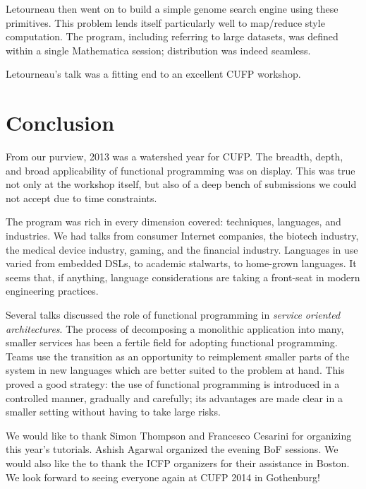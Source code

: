 \documentclass{jfp1}
\begin{document}
Letourneau then went on to build a simple genome search engine using
these primitives.  This problem lends itself particularly well to map/reduce
style computation. The program, including referring to large datasets,
was defined within a single Mathematica session; distribution was indeed
seamless.

Letourneau's talk was a fitting end to an excellent CUFP workshop.

\section{Conclusion}

From our purview, 2013 was a watershed year for CUFP. The breadth,
depth, and broad applicability of functional programming was on
display. This was true not only at the workshop itself, but also of a
deep bench of submissions we could not accept due to time constraints.

The program was rich in every dimension covered: techniques,
languages, and industries. We had talks from consumer Internet
companies, the biotech industry, the medical device industry, gaming,
and the financial industry. Languages in use varied from embedded
DSLs, to academic stalwarts, to home-grown languages. It seems that,
if anything, language considerations are taking a front-seat in modern
engineering practices.

Several talks discussed the role of functional programming in
\textit{service oriented architectures}. The process of decomposing a
monolithic application into many, smaller services has been a
fertile field for adopting functional programming. Teams
use the transition as an opportunity to reimplement smaller parts of
the system in new languages which are better suited to the problem at
hand. This proved a good strategy: the use of functional programming
is introduced in a controlled manner, gradually and carefully; its
advantages are made clear in a smaller setting without having to take
large risks.

We would like to thank Simon Thompson and Francesco Cesarini for
organizing this year's tutorials. Ashish Agarwal organized the evening
BoF sessions. We would also like the to thank the ICFP organizers for
their assistance in Boston. We look forward to seeing everyone again
at CUFP 2014 in Gothenburg!


\end{document}
